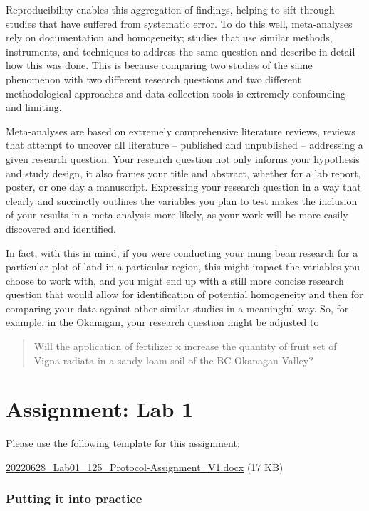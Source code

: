 \documentclass[
]{book}
\begin{document}
Reproducibility enables this aggregation of findings, helping to sift through studies that have suffered from systematic error. To do this well, meta-analyses rely on documentation and homogeneity; studies that use similar methods, instruments, and techniques to address the same question and describe in detail how this was done. This is because comparing two studies of the same phenomenon with two different research questions and two different methodological approaches and data collection tools is extremely confounding and limiting.

Meta-analyses are based on extremely comprehensive literature reviews, reviews that attempt to uncover all literature -- published and unpublished -- addressing a given research question. Your research question not only informs your hypothesis and study design, it also frames your title and abstract, whether for a lab report, poster, or one day a manuscript. Expressing your research question in a way that clearly and succinctly outlines the variables you plan to test makes the inclusion of your results in a meta-analysis more likely, as your work will be more easily discovered and identified.

In fact, with this in mind, if you were conducting your mung bean research for a particular plot of land in a particular region, this might impact the variables you choose to work with, and you might end up with a still more concise research question that would allow for identification of potential homogeneity and then for comparing your data against other similar studies in a meaningful way. So, for example, in the Okanagan, your research question might be adjusted to

\begin{quote}
Will the application of fertilizer x increase the quantity of fruit set of Vigna radiata in a sandy loam soil of the BC Okanagan Valley?
\end{quote}

\hypertarget{assignment-lab-1}{%
\chapter*{Assignment: Lab 1}\label{assignment-lab-1}}

Please use the following template for this assignment:

\href{https://osf.io/download/pxuy9}{20220628\_Lab01\_125\_Protocol-Assignment\_V1.docx} (17 KB)

\hypertarget{putting-it-into-practice}{%
\subsection*{Putting it into practice}\label{putting-it-into-practice}}
\end{document}
